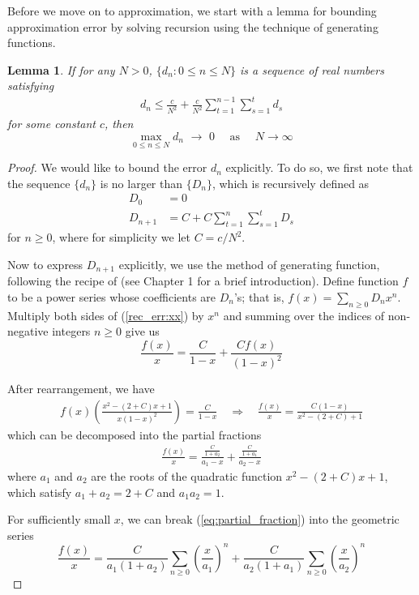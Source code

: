 \documentclass{article}
\newtheorem{lemma}{Lemma}
\begin{document}
Before we move on to approximation, we start with a lemma for bounding approximation error by solving recursion using the technique of generating functions. 
\begin{lemma}
\label{lem:recursive_error}
If for any $N>0$, $\{d_n: 0\leq n\leq N\}$ is a sequence of real numbers satisfying
\begin{align}
d_n \leq 
\frac{c}{N^2} +
\frac{c}{N^2} \sum_{t=1}^{n-1}\sum_{s=1}^{t} d_s \nonumber
\end{align}
for some constant $c$, then $$\max_{0\leq n\leq N}d_n \,\,\rightarrow\,\, 0\quad \text{ as } \quad N\rightarrow\infty$$
\end{lemma}
\begin{proof}
We would like to bound the error $d_n$ explicitly.
To do so, we first note that the sequence $\{d_n\}$ is no larger than $\{D_n\}$, which is recursively defined as 
\begin{align}
D_0 &= 0 \nonumber\\
D_{n+1} &=
C +
C \sum_{t=1}^{n}\sum_{s=1}^{t} D_s
\label{rec_err:xx}
\end{align}
for $n\geq0$,
where for simplicity we let $C=c/N^2$.

Now to express $D_{n+1}$ explicitly, we use the method of generating function, following the recipe of \citet{wilf2005generatingfunctionology} (see Chapter 1 for a brief introduction). 
Define function $f$ to be a power series whose coefficients are $D_n$'s; that is, $f(x)=\sum_{n\geq0}D_n x^n$. 
Multiply both sides of (\ref{rec_err:xx}) by $x^n$ and summing over the indices of non-negative integers $n\geq0$ give us
$$\frac{f(x)}{x} = \frac{C}{1-x} + \frac{Cf(x)}{(1-x)^2}$$

After rearrangement, we have
\begin{align}
f(x)\left(\frac{x^2-(2+C)x+1 }{x(1-x)^2}\right) = \frac{C}{1-x}
\quad\Rightarrow\quad
\frac{f(x)}{x} = \frac{C(1-x)}{x^2-(2+C)+1}
\nonumber
\end{align}
which can be decomposed into the partial fractions
\begin{align}
\frac{f(x)}{x} = \frac{\frac{C}{1+a_2}}{a_1-x} + \frac{\frac{C}{1+a_1}}{a_2-x}
\label{eq:partial_fraction}
\end{align}
where $a_1$ and $a_2$ are the roots of the quadratic function $x^2-(2+C)x+1$,
which satisfy $a_1+a_2=2+C$ and $a_1a_2=1$. 

For sufficiently small $x$, we can break (\ref{eq:partial_fraction}) into the geometric series
$$\frac{f(x)}{x} =
\frac{C}{a_1(1+a_2)}
\sum_{n\geq0} \left(\frac{x}{a_1}\right)^n
+
\frac{C}{a_2(1+a_1)}
\sum_{n\geq0}
\left(\frac{x}{a_2}\right)^n
$$


\end{proof}
\end{document}
